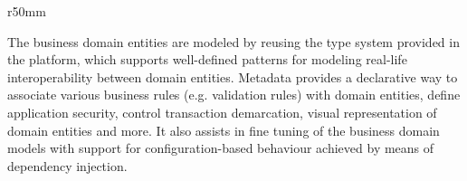   \begin{wrapfigure}{r}{50mm}
    \vspace{-20pt}
    \centering   
    \vspace{-10pt}
  \end{wrapfigure}

  The business domain entities are modeled by reusing the type system provided in the platform, which supports well-defined patterns for modeling real-life interoperability between domain entities.  
  Metadata provides a declarative way to associate various business rules (e.g. validation rules) with domain entities, define application security, control transaction demarcation, visual representation of domain entities and more.
  It also assists in fine tuning of the business domain models with support for configuration-based behaviour achieved by means of dependency injection.

